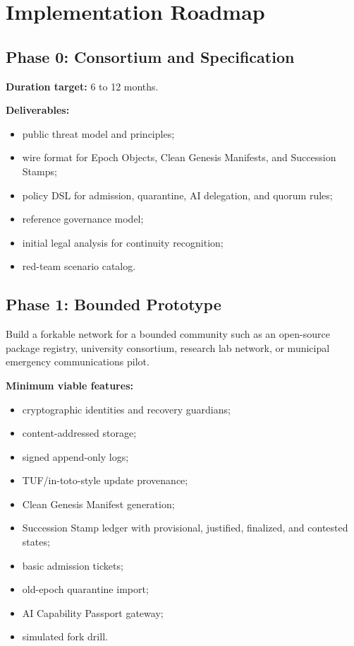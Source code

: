 \documentclass[11pt,letterpaper]{article}
\begin{document}
\section{Implementation Roadmap}

\subsection{Phase 0: Consortium and Specification}

\textbf{Duration target:} 6 to 12 months.

\textbf{Deliverables:}

\begin{itemize}[leftmargin=1.4em]
\item public threat model and principles;
\item wire format for Epoch Objects, Clean Genesis Manifests, and Succession Stamps;
\item policy DSL for admission, quarantine, AI delegation, and quorum rules;
\item reference governance model;
\item initial legal analysis for continuity recognition;
\item red-team scenario catalog.
\end{itemize}

\subsection{Phase 1: Bounded Prototype}

Build a forkable network for a bounded community such as an open-source package registry, university consortium, research lab network, or municipal emergency communications pilot.

\textbf{Minimum viable features:}

\begin{itemize}[leftmargin=1.4em]
\item cryptographic identities and recovery guardians;
\item content-addressed storage;
\item signed append-only logs;
\item TUF/in-toto-style update provenance;
\item Clean Genesis Manifest generation;
\item Succession Stamp ledger with provisional, justified, finalized, and contested states;
\item basic admission tickets;
\item old-epoch quarantine import;
\item AI Capability Passport gateway;
\item simulated fork drill.
\end{itemize}
\end{document}
